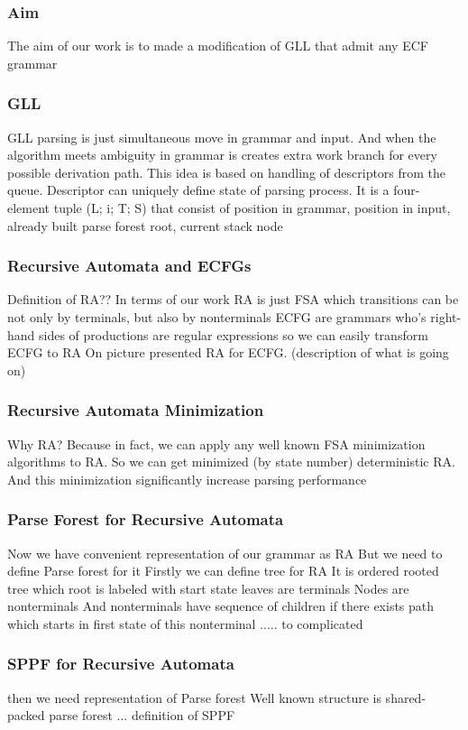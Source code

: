 \documentclass{beamer}
\begin{document}
	\begin{frame} 
		\frametitle{Aim} 
		The aim of our work is to made a modification of GLL that admit any ECF grammar
	\end{frame}  
	
	\begin{frame} 
		\frametitle{GLL} 
		GLL parsing is just simultaneous move in grammar and input.
		And when the algorithm meets ambiguity in grammar is creates
		extra work branch for every possible derivation path.
		This idea is based on handling of descriptors from the queue. 
		Descriptor can uniquely define state of parsing process. 
		It is a four-element tuple (L; i; T; S)
		that consist of position in grammar, position in input, already built parse forest root, current stack node
	\end{frame}
	
	\begin{frame} 
		\frametitle{Recursive Automata and ECFGs} 
		Definition of RA?? 
		In terms of our work RA is just FSA which transitions can be not only by terminals, but also by nonterminals 
		ECFG are grammars who's right-hand sides of productions are regular expressions
		so we can easily transform ECFG to RA
		On picture presented RA for ECFG. (description of what is going on)
	\end{frame} 
	
	\begin{frame} 
		\frametitle{Recursive Automata Minimization}
		Why RA? Because in fact, we can apply any well known FSA minimization algorithms to RA.
		So we can get minimized (by state number) deterministic RA.
		And this minimization significantly increase parsing performance 
	\end{frame}
	
	\begin{frame} 
		\frametitle{Parse Forest for Recursive Automata}
		Now we have convenient representation of our grammar as RA
		But we need to define Parse forest for it
		Firstly we can define tree for RA
		It is ordered rooted tree which root is labeled with start state
		leaves are terminals
		Nodes are nonterminals
		And nonterminals have sequence of children if there exists path
		which starts in first state of this nonterminal
		.....
		to complicated
	\end{frame}
	
	\begin{frame} 
		\frametitle{SPPF for Recursive Automata}
		then we need representation of Parse forest
		Well known structure is shared-packed parse forest
		... definition of SPPF
	\end{frame}
	
\end{document}
